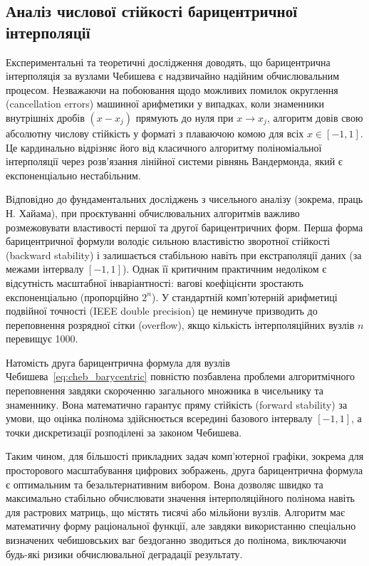 \subsection{Аналіз числової стійкості барицентричної інтерполяції}

Експериментальні та теоретичні дослідження доводять, що барицентрична інтерполяція за вузлами Чебишева є надзвичайно надійним обчислювальним процесом. Незважаючи на побоювання щодо можливих помилок округлення (cancellation errors) машинної арифметики у випадках, коли знаменники внутрішніх дробів $(x - x_j)$ прямують до нуля при $x \to x_j$, алгоритм довів свою абсолютну числову стійкість у форматі з плаваючою комою для всіх $x \in [-1, 1]$. Це кардинально відрізняє його від класичного алгоритму поліноміальної інтерполяції через розв'язання лінійної системи рівнянь Вандермонда, який є експоненціально нестабільним.

Відповідно до фундаментальних досліджень з чисельного аналізу (зокрема, праць Н. Хайама), при проєктуванні обчислювальних алгоритмів важливо розмежовувати властивості першої та другої барицентричних форм. Перша форма барицентричної формули володіє сильною властивістю зворотної стійкості (backward stability) і залишається стабільною навіть при екстраполяції даних (за межами інтервалу $[-1, 1]$). Однак її критичним практичним недоліком є відсутність масштабної інваріантності: вагові коефіцієнти зростають експоненціально (пропорційно $2^n$). У стандартній комп'ютерній арифметиці подвійної точності (IEEE double precision) це неминуче призводить до переповнення розрядної сітки (overflow), якщо кількість інтерполяційних вузлів $n$ перевищує 1000.

Натомість друга барицентрична формула для вузлів Чебишева~\eqref{eq:cheb_barycentric} повністю позбавлена проблеми алгоритмічного переповнення завдяки скороченню загального множника в чисельнику та знаменнику. Вона математично гарантує пряму стійкість (forward stability) за умови, що оцінка полінома здійснюється всередині базового інтервалу $[-1, 1]$, а точки дискретизації розподілені за законом Чебишева. 

Таким чином, для більшості прикладних задач комп'ютерної графіки, зокрема для просторового масштабування цифрових зображень, друга барицентрична формула є оптимальним та безальтернативним вибором. Вона дозволяє швидко та максимально стабільно обчислювати значення інтерполяційного полінома навіть для растрових матриць, що містять тисячі або мільйони вузлів. Алгоритм має математичну форму раціональної функції, але завдяки використанню спеціально визначених чебишовських ваг бездоганно зводиться до полінома, виключаючи будь-які ризики обчислювальної деградації результату.